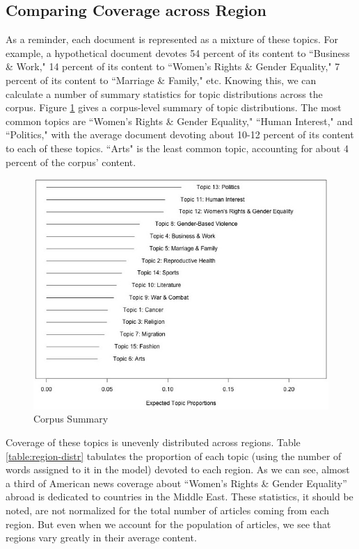 \documentclass[11pt, oneside]{article}
\begin{document}
\subsection{Comparing Coverage across Region}

As a reminder, each document is represented as a mixture of these topics. For example, a hypothetical document devotes 54 percent of its content to ``Business \& Work," 14 percent of its content to ``Women's Rights \& Gender Equality," 7 percent of its content to ``Marriage \& Family," etc. Knowing this, we can calculate a number of summary statistics for topic distributions across the corpus. Figure \ref{fig:summary} gives a corpus-level summary of topic distributions. The most common topics are ``Women's Rights \& Gender Equality," ``Human Interest," and ``Politics," with the average document devoting about 10-12 percent of its content to each of these topics. ``Arts" is the least common topic, accounting for about 4 percent of the corpus' content.

\begin{figure}[h]
\begin{center}
\caption{Corpus Summary}\label{fig:summary}
\includegraphics[scale=0.65]{corpus}
\end{center}
\end{figure}

Coverage of these topics is unevenly distributed across regions. Table \ref{table:region-distr} tabulates the proportion of each topic (using the number of words assigned to it in the model) devoted to each region. As we can see, almost a third of American news coverage about ``Women's Rights \& Gender Equality'' abroad is dedicated to countries in the Middle East. These statistics, it should be noted, are not normalized for the total number of articles coming from each region. But even when we account for the population of articles, we see that regions vary greatly in their average content. 
\end{document}
